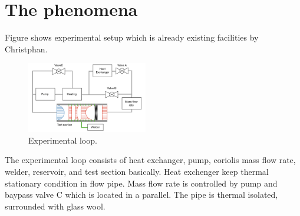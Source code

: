 \documentclass[conference]{IEEEtran}
\begin{document}
\section{The phenomena}
Figure\label{experimental_loop} shows experimental setup which is already existing facilities by Christphan\cite{Christphan2018}.
\begin{figure}[htbp]
  \centering
  \includegraphics[width=0.47\textwidth,natwidth=920,natheight=700]{fig/experimental_loop.png}
  \caption{Experimental loop.}
  \label{experimental_loop}
  \vspace{-2zh}
\end{figure}
The experimental loop consists of heat exchanger, pump, coriolis mass flow rate, welder, reservoir, and test section basically.
Heat exchenger keep thermal stationary condition in flow pipe.
Mass flow rate is controlled by pump and baypass valve C which is located in a parallel.
The pipe is thermal isolated, surrounded with glass wool.\\
\end{document}
